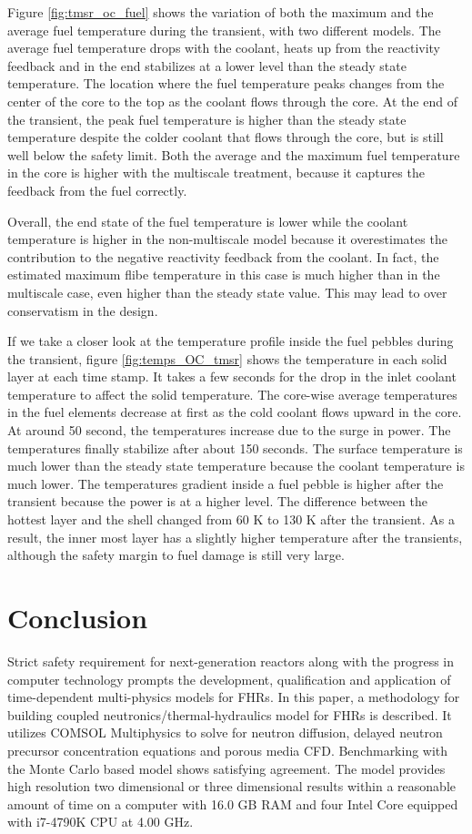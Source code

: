 \documentclass{elsarticle}
\begin{document}
Figure \ref{fig:tmsr_oc_fuel} shows the variation of both the maximum and the average fuel temperature during the transient, with two different models.
The average fuel temperature drops with the coolant, heats up from the reactivity feedback and in the end stabilizes at a lower level than the steady state temperature.
The location where the fuel temperature peaks changes from the center of the core to the top as the coolant flows through the core. At the end of the transient, the peak fuel temperature is higher than the steady state temperature despite the colder coolant that flows through the core, but is still well below the safety limit. 
Both the average and the maximum fuel temperature in the core is higher with the multiscale treatment, because it captures the feedback from the fuel correctly. 

Overall, the end state of the fuel temperature is lower while the coolant temperature is higher in the non-multiscale model because it overestimates the contribution to the negative reactivity feedback from the coolant. 
In fact, the estimated maximum flibe temperature in this case is much higher than in the multiscale case, even higher than the steady state value. This may lead to over conservatism in the design. 


If we take a closer look at the temperature profile inside the fuel pebbles during the transient, figure \ref{fig:temps_OC_tmsr} shows the temperature in each solid layer at each time stamp.
It takes a few seconds for the drop in the inlet coolant temperature to affect the solid temperature. The core-wise average temperatures in the fuel elements decrease at first as the cold coolant flows upward in the core.
At around 50 second, the temperatures increase due to the surge in power. The temperatures finally stabilize after about 150 seconds. The surface temperature is much lower than the steady state temperature because the coolant temperature is much lower.
The temperatures gradient inside a fuel pebble is higher after the transient because the power is at a higher level. The difference between the hottest layer and the shell changed from 60 K to 130 K after the transient. As a result, the inner most layer has a slightly higher temperature after the transients, although the safety margin to fuel damage is still very large. 


\section{Conclusion}
Strict safety requirement for next-generation reactors along with the progress in computer technology prompts the development, qualification and application of time-dependent multi-physics models for FHRs.
In this paper, a methodology for building coupled neutronics/thermal-hydraulics model for FHRs is described. It utilizes COMSOL Multiphysics to solve for neutron diffusion, delayed neutron precursor concentration equations and porous media CFD. Benchmarking with the Monte Carlo based model shows satisfying agreement. The model provides high resolution two dimensional or three dimensional results within a reasonable amount of time on a computer with 16.0 GB RAM and four Intel Core equipped with i7-4790K CPU at 4.00 GHz.
\end{document}
